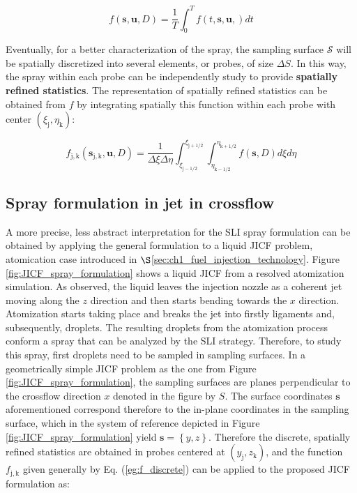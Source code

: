 \begin{equation}
\label{eq:f_general_time_integrated}
f \left( \boldsymbol{s}, \boldsymbol{u}, D \right) = \frac{1}{T} \int_0^T f \left( t, \boldsymbol{s}, \boldsymbol{u}, \right) dt
\end{equation}

Eventually, for a better characterization of the spray, the sampling surface $\mathcal{S}$ will be spatially discretized into several elements, or probes, of size $\Delta S$. In this way, the spray within each probe can be independently study to provide \textbf{spatially refined statistics}. The representation of spatially refined statistics can be obtained from $f$ by integrating spatially this function within each probe with center $\left( \xi_\mathrm{j}, \eta_\mathrm{k} \right)$:

\begin{equation}
\label{eg:f_discrete}
f_\mathrm{j,k} \left( \boldsymbol{s}_\mathrm{j,k}, \boldsymbol{u}, D \right) = \frac{1}{\Delta \xi \Delta \eta} \int_{\xi_\mathrm{j-1/2}}^{\xi_\mathrm{j+1/2}} \int_{\eta_\mathrm{k-1/2}}^{\eta_\mathrm{k+1/2}}  f \left( \boldsymbol{s}, D \right) d\xi d\eta
\end{equation}

\subsection{Spray formulation in jet in crossflow}

A more precise, less abstract interpretation for the SLI spray formulation can be obtained by applying the general formulation to a liquid JICF problem, atomication case introduced in $\S$\ref{sec:ch1_fuel_injection_technology}. Figure \ref{fig:JICF_spray_formulation} shows a liquid JICF from a resolved atomization simulation. As observed, the liquid leaves the injection nozzle as a coherent jet moving along the $z$ direction and then starts bending towards the $x$ direction. Atomization starts taking place and breaks the jet into firstly ligaments and, subsequently, droplets. The resulting droplets from the atomization process conform a spray that can be analyzed by the SLI strategy. Therefore, to study this spray, first droplets need to be sampled in sampling surfaces. In a geometrically simple JICF problem as the one from Figure \ref{fig:JICF_spray_formulation}, the sampling surfaces are planes perpendicular to the crossflow direction $x$ denoted in the figure by $S$. The surface coordinates $\boldsymbol{s}$ aforementioned correspond therefore to the in-plane coordinates in the sampling surface, which in the system of reference depicted in Figure \ref{fig:JICF_spray_formulation} yield $\boldsymbol{s} = \left\lbrace y, z \right\rbrace$. Therefore the discrete, spatially refined statistics are obtained in probes centered at $\left( y_\mathrm{j}, z_\mathrm{k} \right)$, and the function $f_\mathrm{j,k}$ given generally by Eq. (\ref{eg:f_discrete}) can be applied to the proposed JICF formulation as:

